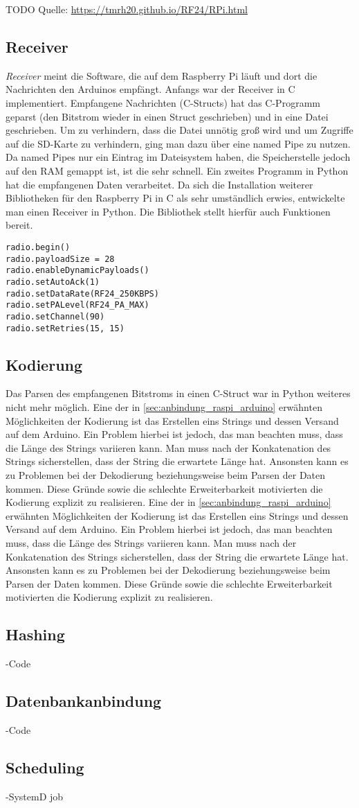 TODO Quelle: \url{https://tmrh20.github.io/RF24/RPi.html}

\subsection{Receiver}
\textit{Receiver} meint die Software, die auf dem Raspberry Pi läuft und dort die Nachrichten den Arduinos empfängt. Anfangs war der Receiver in C implementiert. Empfangene Nachrichten (C-Structs) hat das C-Programm geparst (den Bitstrom wieder in einen Struct geschrieben) und in eine Datei geschrieben. Um zu verhindern, dass die Datei unnötig groß wird und um Zugriffe auf die SD-Karte zu verhindern, ging man dazu über eine named Pipe zu nutzen. Da named Pipes nur ein Eintrag im Dateisystem haben, die Speicherstelle jedoch auf den RAM gemappt ist, ist die sehr schnell. Ein zweites Programm in Python hat die empfangenen Daten verarbeitet. 
Da sich die Installation weiterer Bibliotheken für den Raspberry Pi in C als sehr umständlich erwies, entwickelte man einen Receiver in Python. Die Bibliothek stellt hierfür auch Funktionen bereit. 

\begin{lstlisting}
radio.begin()
radio.payloadSize = 28
radio.enableDynamicPayloads()
radio.setAutoAck(1)
radio.setDataRate(RF24_250KBPS)
radio.setPALevel(RF24_PA_MAX)
radio.setChannel(90)
radio.setRetries(15, 15)
\end{lstlisting}
 

\subsection{Kodierung}
Das Parsen des empfangenen Bitstroms in einen C-Struct war in Python weiteres nicht mehr möglich. 
Eine der in \ref{sec:anbindung_raspi_arduino} erwähnten Möglichkeiten der Kodierung ist das Erstellen eins Strings und dessen Versand auf dem Arduino. Ein Problem hierbei ist jedoch, das man beachten muss, dass die Länge des Strings variieren kann. Man muss nach der Konkatenation des Strings sicherstellen, dass der String die erwartete Länge hat. Ansonsten kann es zu Problemen bei der Dekodierung beziehungsweise beim Parsen der Daten kommen. Diese Gründe sowie die schlechte Erweiterbarkeit motivierten die Kodierung explizit zu realisieren. 
Eine der in \ref{sec:anbindung_raspi_arduino} erwähnten Möglichkeiten der Kodierung ist das Erstellen eins Strings und dessen Versand auf dem Arduino. Ein Problem hierbei ist jedoch, das man beachten muss, dass die Länge des Strings variieren kann. Man muss nach der Konkatenation des Strings sicherstellen, dass der String die erwartete Länge hat. Ansonsten kann es zu Problemen bei der Dekodierung beziehungsweise beim Parsen der Daten kommen. Diese Gründe sowie die schlechte Erweiterbarkeit motivierten die Kodierung explizit zu realisieren. 
\subsection{Hashing}
-Code
\subsection{Datenbankanbindung}
-Code
\subsection{Scheduling}
-SystemD job